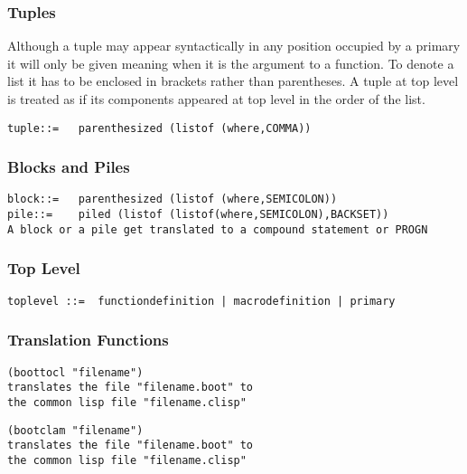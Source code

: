 \documentclass{article}
\begin{document}
\subsubsection{Tuples}
\label{sec:boot:tuples}

Although a tuple may appear syntactically
in any position occupied by a primary
it will only be given meaning when it is the argument to a function.
To denote a list it has to be enclosed in brackets rather than
parentheses. A tuple at top level is treated as if its components
appeared at top level in the order of the list.
\begin{verbatim}
tuple::=   parenthesized (listof (where,COMMA))
\end{verbatim}

\subsubsection{Blocks and Piles}
\label{sec:boot:block}

\begin{verbatim}
block::=   parenthesized (listof (where,SEMICOLON))
pile::=    piled (listof (listof(where,SEMICOLON),BACKSET))
A block or a pile get translated to a compound statement or PROGN
\end{verbatim}

\subsubsection{Top Level}
\label{sec:boot:top-level}

\begin{verbatim}
toplevel ::=  functiondefinition | macrodefinition | primary
\end{verbatim}

\subsubsection{Translation Functions}
\label{sec:boot:translation}

\begin{verbatim}
(boottocl "filename")
translates the file "filename.boot" to
the common lisp file "filename.clisp"
\end{verbatim}

\begin{verbatim}
(bootclam "filename")
translates the file "filename.boot" to
the common lisp file "filename.clisp"
\end{verbatim}
\end{document}
